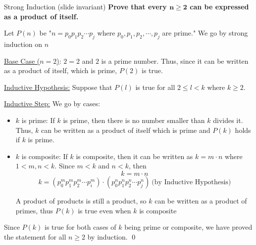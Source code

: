 \documentclass[11pt, nopagenumbers]{adamblan-hw}
\begin{document}
    \begin{question}{\color{red} Strong Induction (slide invariant)}
    \textbf{Prove that every $\mathbf{n\geq2}$ can be expressed as a product of itself.}

    Let $P(n)$ be "$n=p_0 p_1 p_2 \cdots p_j$ where $p_0, p_1, p_2, \cdots, p_j$ are prime."
    We go by strong induction on $n$

    \underline{Base Case ($n=2$)}: $2=2$ and $2$ is a prime number. Thus, since it can be written as a product 
    of itself, which is prime, $P(2)$ is true. 

    \underline{Inductive Hypothesis:} Suppose that $P(l)$ is true for all
    $2 \leq l < k$ where $k \geq 2$.

    \underline{Inductive Step:} We go by cases:
    \begin{itemize}
        \item $k$ is prime: If $k$ is prime, then there is no number smaller than $k$
        divides it. Thus, $k$ can be written as a product of itself which is prime and
        $P(k)$ holds if $k$ is prime. 
        \item $k$ is composite: If $k$ is composite, then it can be written as 
        $k = m \cdot n$ where $1 < m, n < k$. Since $m < k$ and $n < k$, then
        $$k = m \cdot n$$
        $$k = (p_0^m p_1^m p_2^m \cdots p_i^m)\cdot(p_0^n p_1^n p_2^n \cdots p_j^n) \ \text{(by Inductive Hypothesis)}$$

        A product of products is still a product, so $k$ can be written as a product of
        primes, thus $P(k)$ is true even when $k$ is composite
    \end{itemize}
    Since $P(k)$ is true for both cases of $k$ being prime or composite,
    we have proved the statement for all $n \geq 2$ by induction.
    \qed
    \end{question}
\end{document}
